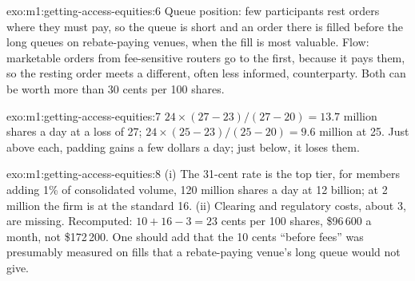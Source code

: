 \begin{solution}{exo:m1:getting-access-equities:6}
Queue position: few participants rest orders where they must pay, so the
queue is short and an order there is filled before the long queues on
rebate-paying venues, when the fill is most valuable. Flow: marketable
orders from fee-sensitive routers go to the  first, because it
pays them, so the resting order meets a different, often less informed,
counterparty. Both can be worth more than 30 cents per 100 shares.
\end{solution}

\begin{solution}{exo:m1:getting-access-equities:7}
$24 \times (27 - 23)/(27 - 20) = 13.7$ million shares a day at a loss of 27;
$24 \times (25 - 23)/(25 - 20) = 9.6$ million at 25. Just above each, padding
gains a few dollars a day; just below, it loses them.
\end{solution}

\begin{solution}{exo:m1:getting-access-equities:8}
(i) The 31-cent rate is the top tier, for members adding 1\% of consolidated
volume, 120 million shares a day at 12 billion; at 2 million the firm is at
the standard 16. (ii) Clearing and regulatory costs, about 3, are missing.
Recomputed: $10 + 16 - 3 = 23$ cents per 100 shares, \$96\,600 a month, not
\$172\,200. One should add that the 10 cents ``before fees'' was presumably
measured on fills that a rebate-paying venue's long queue would not give.
\end{solution}

